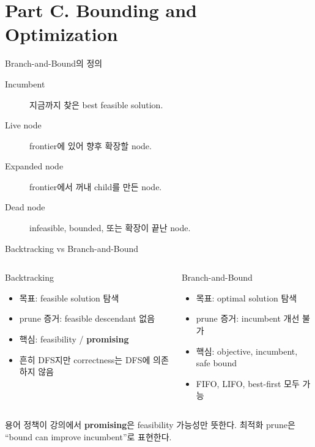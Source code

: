 \section{Part C. Bounding and Optimization}
\begin{frame}{Branch-and-Bound의 정의}
\begin{description}
\item[Incumbent] 지금까지 찾은 best feasible solution.
\item[Live node] frontier에 있어 향후 확장할 node.
\item[Expanded node] frontier에서 꺼내 child를 만든 node.
\item[Dead node] infeasible, bounded, 또는 확장이 끝난 node.
\end{description}
\end{frame}
\begin{frame}{Backtracking vs Branch-and-Bound}
\small
\begin{columns}[T]
\begin{block}{Backtracking}
\begin{itemize}
\item 목표: feasible solution 탐색
\item prune 증거: feasible descendant 없음
\item 핵심: feasibility / \textbf{promising}
\item 흔히 DFS지만 correctness는 DFS에 의존하지 않음
\end{itemize}
\end{block}
\begin{block}{Branch-and-Bound}
\begin{itemize}
\item 목표: optimal solution 탐색
\item prune 증거: incumbent 개선 불가
\item 핵심: objective, incumbent, safe bound
\item FIFO, LIFO, best-first 모두 가능
\end{itemize}
\end{block}
\end{columns}
\begin{alertblock}{용어 정책}이 강의에서 \textbf{promising}은 feasibility 가능성만 뜻한다. 최적화 prune은 ``bound can improve incumbent''로 표현한다.\end{alertblock}
\end{frame}
